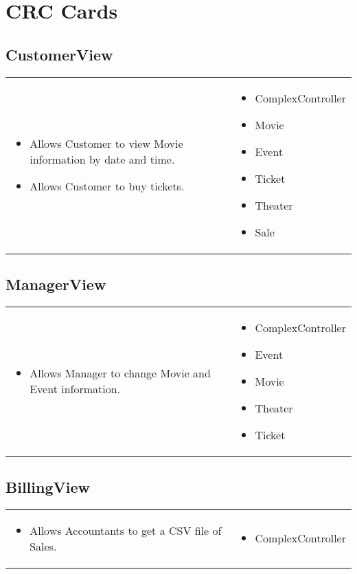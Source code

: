 \documentclass[12pt,titlepage,letterpaper]{article}
\begin{document}
\section{CRC Cards}
\subsection{CustomerView}
\begin{tabular}{p{}|p{}}
\begin{itemize}
\item Allows Customer to view Movie information by date and time.
\item Allows Customer to buy tickets.
\end{itemize} &
\begin{itemize}
\item ComplexController
\item Movie
\item Event
\item Ticket
\item Theater
\item Sale
\end{itemize}
\end{tabular} 
\subsection{ManagerView}
\begin{tabular}{p{}|p{}}
\begin{itemize}
\item Allows Manager to change Movie and Event information.
\end{itemize} &
\begin{itemize}
\item ComplexController
\item Event
\item Movie
\item Theater
\item Ticket
\end{itemize}
\end{tabular} 
\subsection{BillingView}
\begin{tabular}{p{}|p{}}
\begin{itemize}
\item Allows Accountants to get a CSV file of Sales.
\end{itemize} &
\begin{itemize}
\item ComplexController
\end{itemize}
\end{tabular} 
\end{document}
